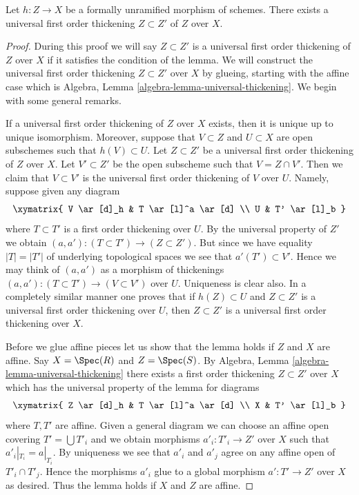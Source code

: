 \begin{lemma}
\label{lemma-universal-thickening}
Let $h : Z \to X$ be a formally unramified morphism of schemes.
There exists a universal first order thickening $Z \subset Z'$ of
$Z$ over $X$.
\end{lemma}

\begin{proof}
During this proof we will say $Z \subset Z'$ is a universal first order
thickening of $Z$ over $X$ if it satisfies the condition of the lemma.
We will construct the universal first order thickening $Z \subset Z'$ over $X$
by glueing, starting with the affine case which is
Algebra, Lemma \ref{algebra-lemma-universal-thickening}.
We begin with some general remarks.

\medskip\noindent
If a universal first order thickening of $Z$ over $X$ exists, then it is unique
up to unique isomorphism. Moreover, suppose that $V \subset Z$ and
$U \subset X$ are open subschemes such that $h(V) \subset U$. Let
$Z \subset Z'$ be a universal first order thickening of $Z$ over $X$.
Let $V' \subset Z'$ be the open subscheme such that $V = Z \cap V'$.
Then we claim that $V \subset V'$ is the universal first order thickening of
$V$ over $U$. Namely, suppose given any diagram
$$
\xymatrix{
V \ar[d]_h & T \ar[l]^a \ar[d] \\
U & T' \ar[l]_b
}
$$
where $T \subset T'$ is a first order thickening over $U$. By the universal
property of $Z'$ we obtain $(a, a') : (T \subset T') \to (Z \subset Z')$.
But since we have equality $|T| = |T'|$ of underlying topological spaces
we see that $a'(T') \subset V'$. Hence we may think of $(a, a')$
as a morphism of thickenings $(a, a') : (T \subset T') \to (V \subset V')$
over $U$. Uniqueness is clear also. In a completely similar manner one proves
that if $h(Z) \subset U$ and $Z \subset Z'$ is a universal first order
thickening over $U$, then $Z \subset Z'$ is a universal first order thickening
over $X$.

\medskip\noindent
Before we glue affine pieces let us show that the lemma holds if
$Z$ and $X$ are affine. Say $X = \Spec(R)$ and $Z = \Spec(S)$. By
Algebra, Lemma \ref{algebra-lemma-universal-thickening}
there exists a first order thickening $Z \subset Z'$ over $X$
which has the universal property of the lemma for diagrams
$$
\xymatrix{
Z \ar[d]_h & T \ar[l]^a \ar[d] \\
X & T' \ar[l]_b
}
$$
where $T, T'$ are affine. Given a general diagram we can choose an affine
open covering $T' = \bigcup T'_i$ and we obtain morphisms
$a'_i : T'_i \to Z'$ over $X$ such that $a'_i|_{T_i} = a|_{T_i}$.
By uniqueness we see that $a'_i$ and $a'_j$ agree on any affine open
of $T'_i \cap T'_j$. Hence the morphisms $a'_i$ glue to a global morphism
$a' : T' \to Z'$ over $X$ as desired. Thus the lemma holds if $X$ and $Z$
are affine.


\end{proof}
